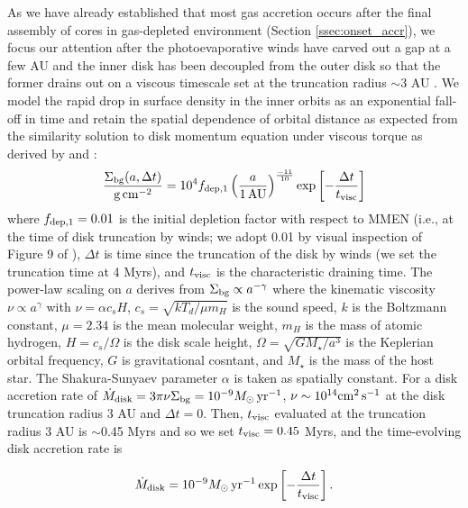 \documentclass[twocolumn]{aastex631}
\begin{document}
As we have already established that most gas accretion occurs after the final assembly of cores in gas-depleted environment (Section \ref{ssec:onset_accr}), we focus our attention after the photoevaporative winds have carved out a gap at a few AU and the inner disk has been decoupled from the outer disk so that the former drains out on a viscous timescale set at the truncation radius $\sim$3 AU \citep[see e.g.,][their Figure 9]{Owen11}. We model the rapid drop in surface density in the inner orbits as an exponential fall-off in time and retain the spatial dependence of orbital distance as expected from the similarity solution to disk momentum equation under viscous torque as derived by \citet{Lynden-Bell74} and \citet{Hartmann98}:
\begin{equation}
        \frac{\Sigma_{\rm bg}(a, \Delta t)}{\rm g\, cm^{-2}} = 10^4 f_{\rm dep,1} \left(\frac{a}{1\,{\rm AU}}\right)^{\frac{-11}{10}}\exp\left[-\frac{\Delta t}{t_{\rm visc}}\right]
    \label{eq:Sigma_gas1}
\end{equation}
%
where $f_{\rm dep,1}=0.01$ is the initial depletion factor with respect to MMEN (i.e., at the time of disk truncation by winds; we adopt 0.01 by visual inspection of Figure 9 of \citealt{Owen11}), $\Delta t$ is time since the truncation of the disk by winds (we set the truncation time at 4 Myrs), and $t_{\rm visc}$ is the characteristic draining time. The power-law scaling on $a$ derives from $\Sigma_{\rm bg} \propto a^{-\gamma}$ where the kinematic viscosity $\nu \propto a^{\gamma}$ with $\nu = \alpha c_s H$, $c_s = \sqrt{kT_d/\mu m_H}$ is the sound speed, $k$ is the Boltzmann constant, $\mu=2.34$ is the mean molecular weight, $m_H$ is the mass of atomic hydrogen, $H = c_s/\Omega$ is the disk scale height, $\Omega = \sqrt{G M_\star/a^3}$ is the Keplerian orbital frequency, $G$ is gravitational cosntant, and $M_\star$ is the mass of the host star. The Shakura-Sunyaev parameter $\alpha$ is taken as spatially constant. For a disk accretion rate of $\dot{M}_{\rm disk} = 3\pi\nu\Sigma_{\rm bg} = 10^{-9} M_\odot\,{\rm yr}^{-1}$, $\nu \sim 10^{14} {\rm cm}^2\,{\rm s}^{-1}$ at the disk truncation radius 3 AU and $\Delta t = 0$. Then, $t_{\rm visc}$ evaluated at the truncation radius 3 AU is $\sim$0.45 Myrs and so we set $t_{\rm visc}=0.45$ Myrs, and the time-evolving disk accretion rate is

\begin{equation}
    \dot{M}_{\rm disk} = 10^{-9}M_\odot\,{\rm yr}^{-1}\exp\left[-\frac{\Delta t}{t_{\rm visc}}\right].
    \label{eq:Mdot_disk}
\end{equation}
\end{document}
